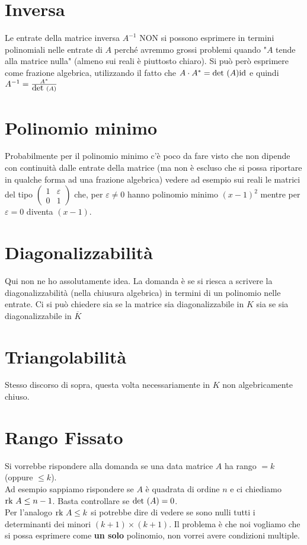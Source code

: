 \documentclass[a4paper,NoNotes,GeneralMath]{stdmdoc}
\theoremstyle{definition}
\begin{document}
	\section {Inversa}
	Le entrate della matrice inversa $A^{-1}$ NON si possono esprimere in termini polinomiali nelle entrate di $A$ perché avremmo grossi problemi quando "$A$ tende alla matrice nulla" (almeno sui reali è piuttosto chiaro). Si può però esprimere come frazione algebrica, utilizzando il fatto che $A \cdot A^* = \mbox{det }(A) \mbox{id}$ e quindi $A^{-1} = \frac{A^*}{\mbox{det }(A)}$
	
	\section {Polinomio minimo}
	Probabilmente per il polinomio minimo c'è poco da fare visto che non dipende con continuità dalle entrate della matrice (ma non è escluso che si possa riportare in qualche forma ad una frazione algebrica) vedere ad esempio sui reali le matrici del tipo $ \left( \begin{array}{cc} 1 & \varepsilon \\ 0 & 1 \end{array} \right) $ che, per $\varepsilon \neq 0$ hanno polinomio minimo $(x-1)^2$ mentre per $\varepsilon = 0$ diventa $(x-1)$.
	
	\section {Diagonalizzabilità}
	Qui non ne ho assolutamente idea. La domanda è se si riesca a scrivere la diagonalizzabilità (nella chiusura algebrica) in termini di un polinomio nelle entrate. Ci si può chiedere sia se la matrice sia diagonalizzabile in $K$ sia se sia diagonalizzabile in $\overline{K}$
	
	\section {Triangolabilità}
	Stesso discorso di sopra, questa volta necessariamente in $K$ non algebricamente chiuso.
	
	\section {Rango Fissato}
	Si vorrebbe rispondere alla domanda se una data matrice $A$ ha rango $= k$ (oppure $\le k$). \\
	Ad esempio sappiamo rispondere se $A$ è quadrata di ordine $n$ e ci chiediamo $\mbox{rk } A \le n-1$. Basta controllare se $\mbox{det }(A) = 0$. \\
	Per l'analogo $\mbox{rk } A \le k$ si potrebbe dire di vedere se sono nulli tutti i determinanti dei minori $(k+1)\times (k+1)$. Il problema è che noi vogliamo che si possa esprimere come {\bf un solo} polinomio, non vorrei avere condizioni multiple.
	
	
	
\end{document}
